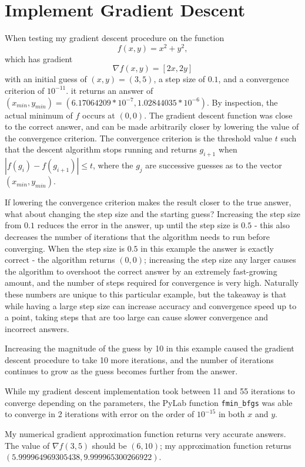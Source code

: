 \documentclass{paper}
\begin{document}
\section{Implement Gradient Descent}

When testing my gradient descent procedure on the function
\[
f(x, y) = x^2 + y^2,
\]
which has gradient
\[
\nabla f(x, y) = [2x, 2y]
\]
with an initial guess of $(x, y) = (3, 5)$, a step size of $0.1$, and a convergence criterion of $10^{-11}$. it returns an answer of $(x_{min}, y_{min}) = (6.17064209 * 10^{-7},   1.02844035 * 10^{-6})$. By inspection, the actual minimum of $f$ occurs at $(0, 0)$. The gradient descent function was close to the correct answer, and can be made arbitrarily closer by lowering the value of the convergence criterion. The convergence criterion is the threshold value $t$ such that the descent algorithm stops running and returns $g_{i+1}$ when $|f(g_i) - f(g_{i+1})| \le t$, where the $g_j$ are successive guesses as to the vector $(x_{min}, y_{min})$.

If lowering the convergence criterion makes the result closer to the true answer, what about changing the step size and the starting guess? Increasing the step size from $0.1$ reduces the error in the answer, up until the step size is $0.5$ - this also decreases the number of iterations that the algorithm needs to run before converging. When the step size is $0.5$ in this example the answer is exactly correct - the algorithm returns $(0, 0)$; increasing the step size any larger causes the algorithm to overshoot the correct answer by an extremely fast-growing amount, and the number of steps required for convergence is very high. Naturally these numbers are unique to this particular example, but the takeaway is that while having a large step size can increase accuracy and convergence speed up to a point, taking steps that are too large can cause slower convergence and incorrect answers.

Increasing the magnitude of the guess by 10 in this example caused the gradient descent procedure to take 10 more iterations, and the number of iterations continues to grow as the guess becomes further from the answer.

While my gradient descent implementation took between 11 and 55 iterations to converge depending on the parameters, the PyLab function \texttt{fmin\_bfgs} was able to converge in 2 iterations with error on the order of $10^{-15}$ in both $x$ and $y$.

My numerical gradient approximation function returns very accurate answers. The value of $\nabla f(3, 5)$ should be $(6, 10)$; my approximation function returns $(5.999964969305438, 9.999965300266922)$.
\end{document}
